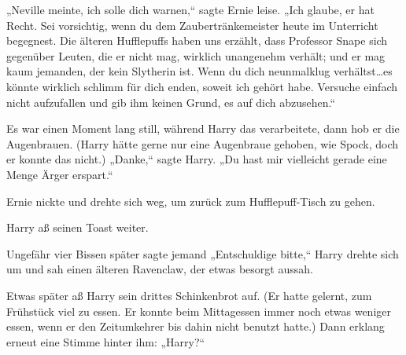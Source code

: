 „Neville meinte, ich solle dich warnen,“ sagte Ernie leise. „Ich glaube, er hat Recht. Sei vorsichtig, wenn du dem Zaubertränkemeister heute im Unterricht begegnest. Die älteren Hufflepuffs haben uns erzählt, dass Professor Snape sich gegenüber Leuten, die er nicht mag, wirklich unangenehm verhält; und er mag kaum jemanden, der kein Slytherin ist. Wenn du dich neunmalklug verhältst…es könnte wirklich schlimm für dich enden, soweit ich gehört habe. Versuche einfach nicht aufzufallen und gib ihm keinen Grund, es auf dich abzusehen.“

Es war einen Moment lang still, während Harry das verarbeitete, dann hob er die Augenbrauen. (Harry hätte gerne nur eine Augenbraue gehoben, wie Spock, doch er konnte das nicht.) „Danke,“ sagte Harry. „Du hast mir vielleicht gerade eine Menge Ärger erspart.“

Ernie nickte und drehte sich weg, um zurück zum Hufflepuff-Tisch zu gehen.

Harry aß seinen Toast weiter.

Ungefähr vier Bissen später sagte jemand „Entschuldige bitte,“ Harry drehte sich um und sah einen älteren Ravenclaw, der etwas besorgt aussah.

Etwas später aß Harry sein drittes Schinkenbrot auf. (Er hatte gelernt, zum Frühstück viel zu essen. Er konnte beim Mittagessen immer noch etwas weniger essen, wenn er den Zeitumkehrer bis dahin nicht benutzt hatte.) Dann erklang erneut eine Stimme hinter ihm: „Harry?“

